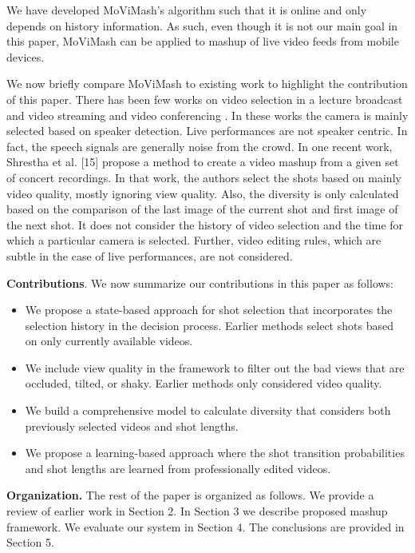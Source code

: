 \documentclass{sig-alternate}
\begin{document}
We have developed MoViMash’s algorithm such that it is online and only depends on history information. As such, even though it is not our main goal in this paper, MoViMash can be applied to mashup of live video feeds from mobile devices.

 We now brieﬂy compare MoViMash to existing work to highlight the contribution of this paper. There has been few works on video selection in a lecture broadcast and video streaming \cite{butcher1987numerical} \cite{economou1983green} and video conferencing \cite{fassas2002hematopoietic}. In these works the camera is mainly selected based on speaker detection. Live performances are not speaker centric. In fact, the speech signals are generally noise from the crowd. In one recent work, Shrestha et al. [15] propose a method to create a video mashup from a given set of concert recordings. In that work, the authors select the shots based on mainly video quality, mostly ignoring view quality. Also, the diversity is only calculated based on the comparison of the last image of the current shot and ﬁrst image of the next shot. It does not consider the history of video selection and the time for which a particular camera is selected. Further, video editing rules, which are subtle in the case of live performances, are not considered. 

\textbf {Contributions}. We now summarize our contributions in this paper as follows:
\begin{itemize}
\item We propose a state-based approach for shot selection that incorporates the selection history in the decision process. Earlier methods select shots based on only currently available videos. 
\item We include view quality in the framework to ﬁlter out the bad views that are occluded, tilted, or shaky. Earlier methods only considered video quality. 
\item We build a comprehensive model to calculate diversity that considers both previously selected videos and shot lengths. \item We propose a learning-based approach where the shot transition probabilities and shot lengths are learned from professionally edited videos. 
\end{itemize}
\textbf{Organization.} The rest of the paper is organized as follows. We provide a review of earlier work in Section 2. In Section 3 we describe proposed mashup framework. We evaluate our system in Section 4. The conclusions are provided in Section 5.
\end{document}
